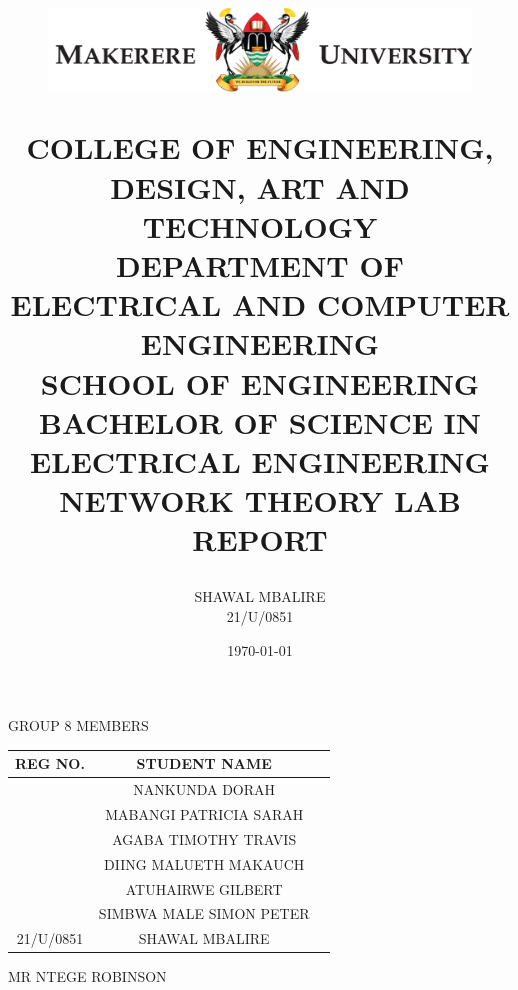 \documentclass{article}
\title{
    \begin{figure}[H]
        \centering
        \includegraphics{../mak_logo.png}
    \end{figure}
    COLLEGE OF ENGINEERING, DESIGN, ART AND TECHNOLOGY\\
    DEPARTMENT OF ELECTRICAL AND COMPUTER ENGINEERING\\
    SCHOOL OF ENGINEERING\\
    BACHELOR OF SCIENCE IN ELECTRICAL ENGINEERING\\
    NETWORK THEORY LAB REPORT\\
}
\author{
    SHAWAL MBALIRE\\
    21/U/0851
}
\date{\today}
\begin{document}
\maketitle
\begin{center}

    GROUP 8 MEMBERS
    \begin{tabular}{|c|c|c|}
        \hline
        \textbf{REG NO.} & \textbf{STUDENT NAME}\\
        \hline
        & NANKUNDA DORAH & \\
        \hline
        & MABANGI PATRICIA SARAH & \\
        \hline
        & AGABA TIMOTHY TRAVIS & \\
        \hline
        & DIING MALUETH MAKAUCH & \\
        \hline
        & ATUHAIRWE GILBERT & \\
        \hline
        & SIMBWA MALE SIMON PETER & \\
        \hline
        21/U/0851 & SHAWAL MBALIRE & \\
        \hline
    \end{tabular}
    MR NTEGE ROBINSON
\end{center}



\end{document}
